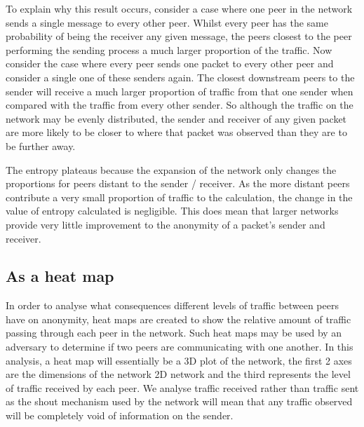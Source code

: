 \documentclass[ %
                    author={Luke Murray},
                supervisor={Dr. Simon Hollis},
                     title={Shadow Peer-to-Peer Networks},
                  subtitle={},
                    degree={MEng},
                      year={2013} ]{thesis}
\begin{document}
To explain why this result occurs, consider a case where one peer in the network sends a single message to every other peer. Whilst every peer has the same probability of being the receiver any given message, the peers closest to the peer performing the sending process a much larger proportion of the traffic. Now consider the case where every peer sends one packet to every other peer and consider a single one of these senders again. The closest downstream peers to the sender will receive a much larger proportion of traffic from that one sender when compared with the traffic from every other sender. So although the traffic on the network may be evenly distributed, the sender and receiver of any given packet are more likely to be closer to where that packet was observed than they are to be further away.

The entropy plateaus because the expansion of the network only changes the proportions for peers distant to the sender / receiver. As the more distant peers contribute a very small proportion of traffic to the calculation, the change in the value of entropy calculated is negligible. This does mean that larger networks provide very little improvement to the anonymity of a packet's sender and receiver.

\subsection{As a heat map}

In order to analyse what consequences different levels of traffic between peers have on anonymity, heat maps are created to show the relative amount of traffic passing through each peer in the network. Such heat maps may be used by an adversary to determine if two peers are communicating with one another. In this analysis, a heat map will essentially be a 3D plot of the network, the first 2 axes are the dimensions of the network 2D network and the third represents the level of traffic received by each peer. We analyse traffic received rather than traffic sent as the shout mechanism used by the network will mean that any traffic observed will be completely void of information on the sender. 
\end{document}
